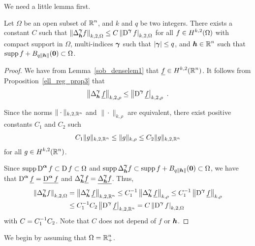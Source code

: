We need a little lemma first.

\begin{lemma} \label{ellRegProp3Omega}
Let $\Omega$ be an open subset of $\displaystyle \mathbb{R}^n$, and $k$ and $q$ be two
integers.  There exists a constant $C$ such that
$\displaystyle \left\| \Delta^{{\bm{\gamma}}}_{{\bm{h}}} f  \right\|_{k,2,\Omega}
\leq C \left\| \operatorname{D}^{{\bm{\gamma}}} f\right|_{k,2,\Omega}$ for all
$\displaystyle f\in H^{k,2}(\Omega)$ with compact support in $\Omega$,
multi-indices ${\bm{\gamma}}$ such that $|{\bm{\gamma}}|\leq q$, and
$\displaystyle {\bm{h}} \in \mathbb{R}^n$ such that
$\displaystyle \operatorname{supp} f + B_{q\|{\bm{h}}\|}({\bm{0}}) \subset \Omega$.
\end{lemma}

\begin{proof}
We have from Lemma~\ref{sob_denselem1} that
$\displaystyle \underline{f} \in H^{k,2}(\mathbb{R}^n)$.  It follows from
Proposition~\ref{ell_reg_prop3} that
\[
\left\| \Delta^{\VEC{\gamma}}_{\VEC{h}}\, \underline{f}  \right\|_{k,2,\rho}
\leq \left\| \diff^{\VEC{\gamma}} \underline{f}\right|_{k,2,\rho} \ .
\]

Since the norms $\|\cdot\|_{k,2,\mathbb{R}^n}$ and $\|\cdot\|_{k,\rho}$ are
equivalent, there exist positive constants $C_1$ and $C_2$ such
\[
  C_1 \|g\|_{k,2,\mathbb{R}^n} \leq \|g\|_{k,\rho} \leq C_2 \|g\|_{k,2,\mathbb{R}^n}
\]
for all $\displaystyle g \in H^{k,2}(\mathbb{R}^n)$.

Since $\displaystyle \operatorname{supp} \operatorname{D}^{{\bm{\alpha}}} f \subset \operatorname{D} f
\subset \Omega$ and
$\displaystyle \operatorname{supp} \Delta^{{\bm{\gamma}}}_{{\bm{h}}} f \subset
\operatorname{supp} f + B_{q\|{\bm{h}}\|}({\bm{0}}) \subset \Omega$, we have that
$\displaystyle \operatorname{D}^{{\bm{\alpha}}} \underline{f}
= \underline{\operatorname{D}^{{\bm{\alpha}}} f}$
and $\displaystyle \Delta^{{\bm{\gamma}}}_{{\bm{h}}} \underline{f}
= \underline{\Delta^{{\bm{\gamma}}}_{{\bm{h}}} f}$.  Thus,
\begin{align*}
\left\| \Delta^{{\bm{\gamma}}}_{{\bm{h}}} f  \right\|_{k,2,\Omega}
&= \left\| \Delta^{{\bm{\gamma}}}_{{\bm{h}}}\, \underline{f}  \right\|_{k,2,\mathbb{R}^n}
\leq C_1^{-1} \left\| \Delta^{{\bm{\gamma}}}_{{\bm{h}}}\, \underline{f}
\right\|_{k,\rho} 
\leq C_1^{-1} \left\| \operatorname{D}^{{\bm{\gamma}}} \underline{f}  \right\|_{k,\rho} \\
&\leq C_1^{-1} C_2 \left\| \operatorname{D}^{{\bm{\gamma}}} \underline{f} \right|_{k,2,\mathbb{R}^n}
= C \left\| \operatorname{D}^{{\bm{\gamma}}} f \right|_{k,2,\Omega}
\end{align*}
with $\displaystyle C = C_1^{-1} C_2$.  Note that $C$ does not depend
of $f$ or ${\bm{h}}$.
\end{proof}

We begin by assuming that $\displaystyle \Omega = \mathbb{R}^n_+$.

